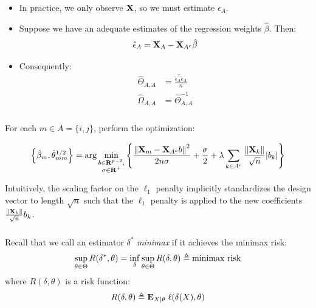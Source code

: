 \begin{frame}[fragile] \frametitle{}
    \begin{itemize}
        \item In practice, we only observe $\mathbf{X}$, so we must estimate
            $\epsilon_A$.
        \item Suppose we have an adequate estimates of the regression weights
            $\hat\beta$.  Then:
            $$
            \hat\epsilon_A = \mathbf{X}_A - \mathbf{X}_{A^c}\hat\beta
            $$
        \item Consequently:
            \vspace{-0.1cm}
            \begin{align*}
                \hat\Theta_{A, A}
                &= \frac{\hat\epsilon_A^\top\hat\epsilon_A}{n}    \\
                \hat\Omega_{A, A} &= \hat\Theta_{A, A}^{-1}
            \end{align*}
    \end{itemize}
\end{frame}
\begin{frame}[fragile] \frametitle{}

    For each $m \in A = \{i, j\}$, perform the optimization: 

    $$
    \left\{\hat\beta_m, \hat\theta^{1/2}_{mm}\right\}
    =
    \arg\min_{\substack{b\in\mathbf{R}^{p-2},\\\sigma \in \mathbf{R}^+}}
    \left\{
    \frac{\left\lVert\mathbf{X}_m - \mathbf{X}_{A^c}b\right\rVert^2}{2n\sigma}
    + \frac{\sigma}{2} 
    + \lambda\sum_{k\in A^c}\frac{\left\lVert\mathbf{X}_k\right\rVert}{\sqrt{n}}|b_k|
    \right\}
    $$
    
    Intuitively, the scaling factor on the $\ell_1$ penalty implicitly standardizes
    the design vector to length $\sqrt{n}$ such that the $\ell_1$ penalty is
    applied to the new coefficients $\frac{\left\lVert\mathbf{X}_k\right\rVert}{\sqrt n}b_k$.

\end{frame}
\begin{frame}[fragile] \frametitle{}
\end{frame}
\begin{frame}[fragile] \frametitle{}

    \vspace{0.5cm}
    Recall that we call an estimator $\delta^*$ \textit{minimax} if it achieves
    the minimax risk:
    $$
    \sup_{\theta\in\Theta} R(\delta^*, \theta)
    =  \inf_\delta \sup_{\theta\in\Theta} R(\delta, \theta)
    \triangleq \text{minimax risk}
    $$
    where $R(\delta, \theta)$ is a risk function:
    $$
    R(\delta, \theta) \triangleq \mathbf{E}_{X|\theta}\; \ell(\delta(X), \theta)
    $$
\end{frame}
